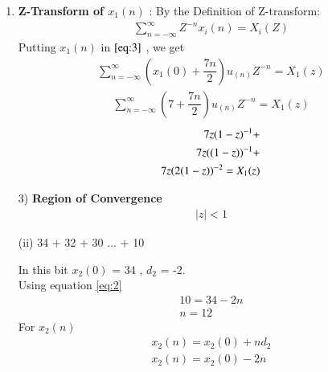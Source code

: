\documentclass[journal,12pt,twocolumn]{IEEEtran}
\theoremstyle{remark}
\begin{document}
\begin{enumerate}
\begin{figure}[!ht]
\captionsetup{Graph:1 $x_1(n)$ vs n }
\end{figure}
\vspace{0.05cm}
\item 
\textbf{Z-Transform of $x_1(n)$} :
\vspace{0.2cm}
By the Definition of Z-transform:
\begin{align}
 \sum_{n=-\infty}^{\infty} Z^{-n}x_i(n) = X_i(Z)\label{eq:3}
 \end{align}
\vspace{0.05cm}Putting $x_1(n)$ in $\eqref{eq:3}$ , we get \vspace{0.05cm}
\begin{align}
     \sum_{n=-\infty}^{\infty}(x_1(0) + \dfrac{7n}{2})u_{(n)}Z^{-n} =X_1(z)
\end{align}
\begin{align}
\sum_{n=-\infty}^{\infty}(7 + \dfrac{7n}{2})u_{(n)}Z^{-n} =X_1(z)
\end{align}
\begin{align}
\notag7z(1-z)^{-1}+\\
\notag 7z((1-z))^{-1}+\\
7z(2(1-z))^{-2}=X_1(z)
\end{align}
\vspace{0.05cm}
\vspace{0.05cm}
\item[3)]
\textbf{Region of Convergence}
\vspace{0.05cm}
\begin{align}
    \lvert z\rvert  <  1 
    \end{align}

\vspace{1cm}

\vspace{0.5cm}
\item[(ii)]
 34 + 32 + 30 ... + 10\vspace{0.05cm}
\vspace{0.2cm}

In this bit  $x_2(0)$ = 34 , $d_2$ = -2.\\

Using equation \eqref{eq:2}
\begin{align}
     10 = 34 -2n\\
     n=12 
     \end{align}
For $x_2(n)$
\begin{align}
x_2(n) = x_2(0) + nd_2\\
x_2(n) = x_2(0) -2n
\end{align}


\end{enumerate}
\end{document}

